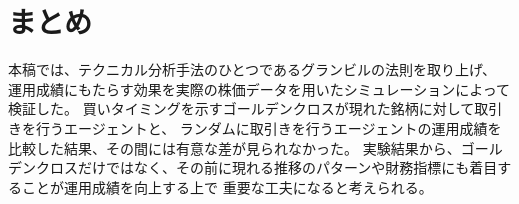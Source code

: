 \documentclass[twocolumn,jsaiac]{jarticle}
\begin{document}
\section{まとめ}
本稿では、テクニカル分析手法のひとつであるグランビルの法則を取り上げ、
運用成績にもたらす効果を実際の株価データを用いたシミュレーションによって検証した。
買いタイミングを示すゴールデンクロスが現れた銘柄に対して取引きを行うエージェントと、
ランダムに取引きを行うエージェントの運用成績を比較した結果、その間には有意な差が見られなかった。
実験結果から、ゴールデンクロスだけではなく、その前に現れる推移のパターンや財務指標にも着目することが運用成績を向上する上で
重要な工夫になると考えられる。



\end{document}
